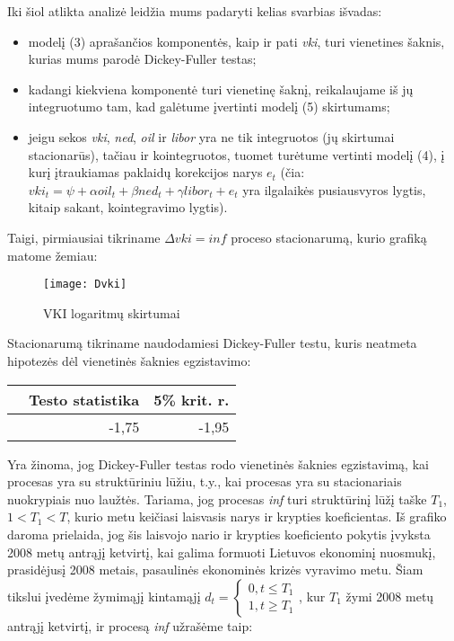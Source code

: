 \documentclass[a4paper]{article}
\begin{document}
Iki šiol atlikta analizė leidžia mums padaryti kelias svarbias išvadas: 
\begin{itemize}
\item modelį (3) aprašančios komponentės, kaip ir pati  \textit{vki}, turi vienetines šaknis, kurias mums parodė Dickey-Fuller testas;
\item kadangi kiekviena komponentė turi vienetinę šaknį, reikalaujame iš jų integruotumo tam, kad galėtume įvertinti modelį (5) skirtumams;
\item 	jeigu sekos \textit{vki},  \textit{ned},  \textit{oil} ir  \textit{libor} yra ne tik integruotos (jų skirtumai stacionarūs), tačiau ir kointegruotos, tuomet turėtume vertinti modelį (4), į kurį įtraukiamas paklaidų korekcijos narys $\textit{e}_t $ (čia: $\textit{vki}_t = \psi + \alpha\textit{oil}_t + \beta\textit{ned}_t + \gamma\textit{libor}_t + \textit{e}_t$ yra ilgalaikės pusiausvyros lygtis, kitaip sakant, kointegravimo lygtis).
\end{itemize}

Taigi, pirmiausiai tikriname $\Delta\textit{vki}=\textit{inf}$ proceso stacionarumą, kurio grafiką matome žemiau:

\begin{figure}[h!]
\center
\texttt{[image: Dvki]}
\caption{VKI logaritmų skirtumai}
\end{figure}

Stacionarumą tikriname naudodamiesi Dickey-Fuller testu, kuris neatmeta hipotezės dėl vienetinės šaknies egzistavimo:

\begin{table}[!h]
\begin{center}
\begin{tabular}{rrr}
  \hline
 & Testo statistika & 5\% krit. r. \\ 
  \hline
 & -1,75 & -1,95 \\ 
   \hline
\end{tabular}
\end{center}
\end{table} \indent

Yra žinoma, jog Dickey-Fuller testas rodo vienetinės šaknies egzistavimą, kai procesas yra su struktūriniu lūžiu, t.y., kai procesas yra su stacionariais nuokrypiais nuo laužtės. Tariama, jog procesas \textit{inf} turi struktūrinį lūžį taške $T_1$, $1<T_1<T$, kurio metu keičiasi laisvasis narys ir krypties koeficientas. Iš grafiko daroma prielaida, jog šis laisvojo nario ir krypties koeficiento pokytis įvyksta 2008 metų antrąjį ketvirtį, kai galima formuoti Lietuvos ekonominį nuosmukį, prasidėjusį 2008 metais, pasaulinės ekonominės krizės vyravimo metu. Šiam tikslui įvedėme žymimąjį kintamąjį $d_t = \begin{cases}0, t \leq T_1 \\ 1, t \geq T_1 \end{cases}$, kur $T_1$ žymi 2008 metų antrąjį ketvirtį, ir procesą \textit{inf} užrašėme taip:
\end{document}
